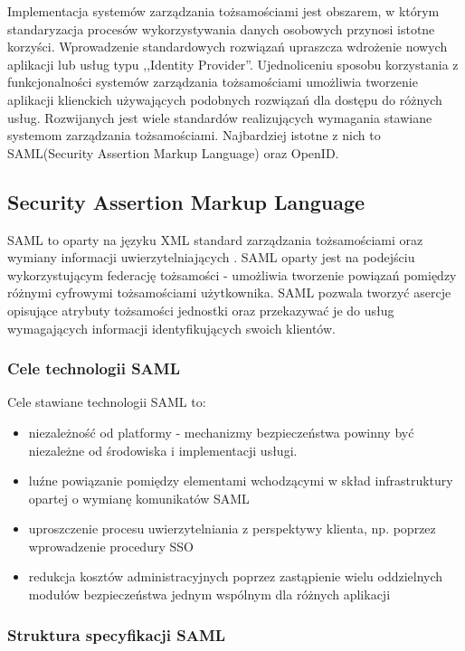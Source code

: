 Implementacja systemów zarządzania tożsamościami jest obszarem, w którym standaryzacja procesów wykorzystywania danych osobowych przynosi istotne korzyści. Wprowadzenie standardowych rozwiązań upraszcza wdrożenie nowych aplikacji lub usług typu ,,Identity Provider''. Ujednoliceniu sposobu korzystania z funkcjonalności systemów zarządzania tożsamościami umożliwia tworzenie aplikacji klienckich używających podobnych rozwiązań dla dostępu do różnych usług. Rozwijanych jest wiele standardów realizujących wymagania stawiane systemom zarządzania tożsamościami. Najbardziej istotne z nich to SAML(Security Assertion Markup Language) oraz OpenID. 

\subsection{Security Assertion Markup Language}

	SAML to oparty na języku XML standard zarządzania tożsamościami oraz wymiany informacji uwierzytelniających \cite{Wisniewski05}. SAML oparty jest na podejściu wykorzystującym federację tożsamości - umożliwia tworzenie powiązań pomiędzy różnymi cyfrowymi tożsamościami użytkownika. SAML pozwala tworzyć asercje opisujące atrybuty tożsamości jednostki oraz przekazywać je do usług wymagających informacji identyfikujących swoich klientów.

	\subsubsection{Cele technologii SAML}

		Cele stawiane technologii SAML to\cite{Wisniewski05}:

		\begin{itemize}
		  \item niezależność od platformy - mechanizmy bezpieczeństwa powinny być niezależne od środowiska i implementacji usługi.
		  \item luźne powiązanie pomiędzy elementami wchodzącymi w skład infrastruktury opartej o wymianę komunikatów SAML
		  \item uproszczenie procesu uwierzytelniania z perspektywy klienta, np. poprzez wprowadzenie procedury SSO
		  \item redukcja kosztów administracyjnych poprzez zastąpienie wielu oddzielnych modułów bezpieczeństwa jednym wspólnym dla  różnych aplikacji
		\end{itemize}

	\subsubsection{Struktura specyfikacji SAML}

